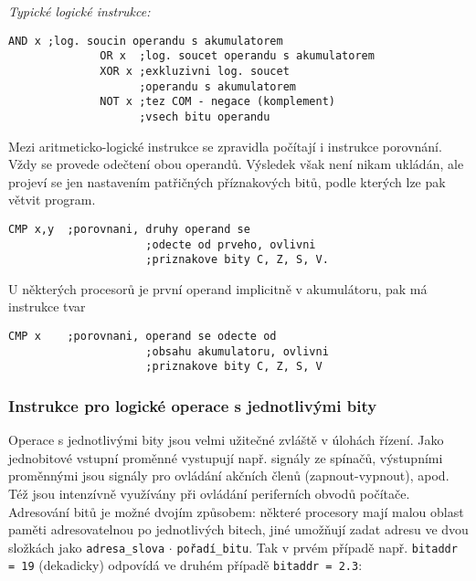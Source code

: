           \emph{Typické logické instrukce:}
            \begin{lstlisting}[style=luaMITASMStyle]
              AND x ;log. soucin operandu s akumulatorem
              OR x  ;log. soucet operandu s akumulatorem
              XOR x ;exkluzivni log. soucet 
                    ;operandu s akumulatorem
              NOT x ;tez COM - negace (komplement) 
                    ;vsech bitu operandu
            \end{lstlisting}
      
          Mezi aritmeticko-logické instrukce se zpravidla počítají i instrukce porovnání. Vždy se 
          provede odečtení obou operandů. Výsledek však není nikam ukládán, ale projeví se jen 
          nastavením patřičných příznakových bitů, podle kterých lze pak větvit program.
       
          \begin{lstlisting}[style=luaMITASMStyle]
            CMP x,y  ;porovnani, druhy operand se 
                     ;odecte od prveho, ovlivni
                     ;priznakove bity C, Z, S, V.
          \end{lstlisting}
       
          U některých procesorů je první operand implicitně v akumulátoru, pak má instrukce tvar
       
          \begin{lstlisting}[style=luaMITASMStyle]
            CMP x    ;porovnani, operand se odecte od 
                     ;obsahu akumulatoru, ovlivni 
                     ;priznakove bity C, Z, S, V
          \end{lstlisting}

        \subsubsection{Instrukce pro logické operace s jednotlivými bity}      
          Operace s jednotlivými bity jsou velmi užitečné zvláště v úlohách řízení. Jako 
          jednobitové vstupní proměnné vystupují např. signály ze spínačů, výstupními proměnnými 
          jsou signály pro ovládání akčních členů (zapnout-vypnout), apod. Též jsou intenzívně 
          využívány při ovládání periferních obvodů počítače. Adresování bitů je možné dvojím 
          způsobem: některé procesory mají malou oblast paměti adresovatelnou po jednotlivých 
          bitech, jiné umožňují zadat adresu ve dvou složkách jako \texttt{adresa\_slova} \(\cdot\) 
          \texttt{pořadí\_bitu}. Tak v prvém případě např. \texttt{bitaddr = 19} (dekadicky) 
          odpovídá ve druhém případě \texttt{bitaddr = 2.3}:

